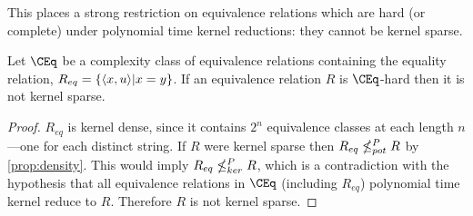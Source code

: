 This places a strong restriction on equivalence relations which are hard (or complete) under polynomial time kernel reductions: they cannot be kernel sparse.

\begin{corollary}
  Let $\CEq$ be a complexity class of equivalence relations containing the equality relation, $R_{eq}=\{\langle x,u\rangle|x=y\}$.
  If an equivalence relation $R$ is $\CEq$-hard then it is not kernel sparse.
\end{corollary}
\begin{proof}
  $R_{eq}$ is kernel dense, since it contains $2^n$ equivalence classes at each length $n$---one for each distinct string.
  If $R$ were kernel sparse then $R_{eq}\nleq^{P}_{pot} R$ by \autoref{prop:density}.
  This would imply $R_{eq}\nleq^{P}_{ker} R$, which is a contradiction with the hypothesis that all equivalence relations in $\CEq$ (including $R_{eq}$) polynomial time kernel reduce to $R$.
  Therefore $R$ is not kernel sparse.
\end{proof}

